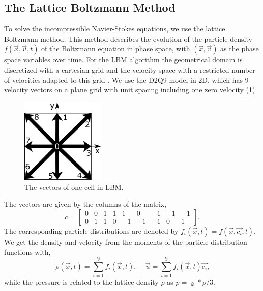 \documentclass[final,leqno,onefignum,onetabnum]{siamltexmm}
\begin{document}
\subsection{The Lattice Boltzmann Method}
To solve the incompressible Navier-Stokes equations, we use the lattice Boltzmann method. This method describes the evolution of the particle density $f(\vec{x},\vec{v},t)$ of the Boltzmann equation in phase space, with $(\vec{x},\vec{v})$ as the phase space variables over time. For the LBM algorithm the geometrical domain is discretized with a cartesian grid and the velocity space with a restricted number of velocities adapted to this grid \cite{LBM1,LBM2,LBM3,LBM4}. We use the D2Q9 model in 2D, which has 9 velocity vectors on a plane grid with unit spacing including one zero velocity (\cref{lbmc_i}). 
\begin{figure}
	\hfill\includegraphics[width=4cm,natwidth=403,natheight=409]{LBMc_i.png}\hspace*{\fill}
	\caption{The vectors of one cell in LBM.}
	\label{lbmc_i}
\end{figure}
The vectors are given by the columns of the matrix,
\begin{equation}
	c = 
	\begin{bmatrix}
	0 & 0 & 1 & 1 &  1 &  0 & -1 & -1 & -1 \\
	0 & 1 & 1 & 0 & -1 & -1 & -1 &  0 &  1
	\end{bmatrix}
	\text{.}
  \label{disc_vel}
\end{equation}
The corresponding particle distributions are denoted by $f_i(\vec{x},t) = f(\vec{x},\vec{c_i},t)$. We get the density and velocity from the moments of the particle distribution functions with,
\begin{equation}
	\rho(\vec{x},t) = \sum_{i=1}^{9} f_i(\vec{x},t) \text{, } \quad
	\vec{u} = \sum_{i=1}^{9} f_i(\vec{x},t)\vec{c_i} \text{,}
\end{equation} 
while the pressure is related to the lattice density $\rho$ as $p=\varrho * \rho/3$.
\end{document}
